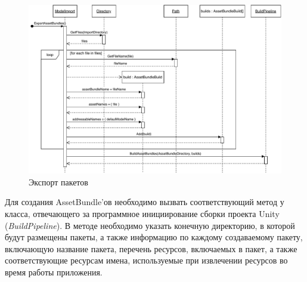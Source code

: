 \begin{figure}[ht]
    \centering
    \includegraphics[width=1.0\textwidth]{images/UML-SExportBundles.pdf}
    \caption{Экспорт пакетов}
    \label{figure:SExportBundles}
\end{figure}

Для создания AssetBundle'ов необходимо вызвать соответствующий метод
у класса, отвечающего за программное инициирование сборки проекта Unity
(\emph{BuildPipeline}). В методе необходимо указать конечную директорию,
в которой будут размещены пакеты, а также информацию по каждому создаваемому пакету,
включающую название пакета, перечень ресурсов, включаемых в пакет,
а также соответствующие ресурсам имена, используемые при извлечении
ресурсов во время работы приложения.\cite{DocUnity,UnityAssetsResourcesBundles}
